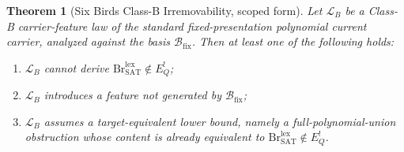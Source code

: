 \documentclass[11pt]{article}
\newcommand{\EQbang}{E^{!}_{Q}}
\newtheorem{theorem}{Theorem}[section]
\theoremstyle{definition}
\begin{document}
\begin{theorem}[Six Birds Class-B Irremovability, scoped form]
\label{thm:pvnp:irremovability-scoped}
Let \(\mathcal L_B\) be a Class-B carrier-feature law of the standard
fixed-presentation polynomial current carrier, analyzed against the
basis \(\mathcal B_{\mathrm{fix}}\).  Then at least one of the
following holds:
\begin{enumerate}
\item \(\mathcal L_B\) cannot derive
  \(\mathrm{Br}^{\mathrm{lex}}_{\mathrm{SAT}}\notin\EQbang\);
\item \(\mathcal L_B\) introduces a feature not generated by
  \(\mathcal B_{\mathrm{fix}}\);
\item \(\mathcal L_B\) assumes a target-equivalent lower bound, namely
  a full-polynomial-union obstruction whose content is already
  equivalent to
  \(\mathrm{Br}^{\mathrm{lex}}_{\mathrm{SAT}}\notin\EQbang\).
\end{enumerate}
\end{theorem}
\end{document}

